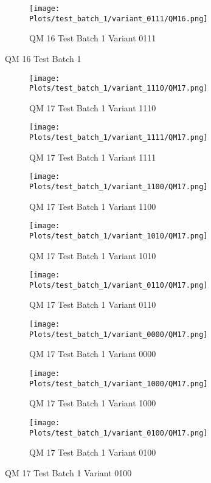 \documentclass{DissertateFigs}
\begin{document}
\begin{figure}[t!]
\medskip

    \begin{subfigure}{0.33\textwidth}
    \texttt{[image: Plots/test\_batch\_1/variant\_0111/QM16.png]}
    \caption{QM 16 Test Batch 1 Variant 0111}
    \end{subfigure}
\caption{QM 16 Test Batch 1}
    \end{figure}
\clearpage
\begin{figure}[t!]
    \begin{subfigure}{0.43\textwidth}
    \texttt{[image: Plots/test\_batch\_1/variant\_1110/QM17.png]}
    \caption{QM 17 Test Batch 1 Variant 1110}
    \end{subfigure}
    \begin{subfigure}{0.43\textwidth}
    \texttt{[image: Plots/test\_batch\_1/variant\_1111/QM17.png]}
    \caption{QM 17 Test Batch 1 Variant 1111}
    \end{subfigure}

\medskip

    \begin{subfigure}{0.43\textwidth}
    \texttt{[image: Plots/test\_batch\_1/variant\_1100/QM17.png]}
    \caption{QM 17 Test Batch 1 Variant 1100}
    \end{subfigure}
    \begin{subfigure}{0.43\textwidth}
    \texttt{[image: Plots/test\_batch\_1/variant\_1010/QM17.png]}
    \caption{QM 17 Test Batch 1 Variant 1010}
    \end{subfigure}

\medskip

    \begin{subfigure}{0.43\textwidth}
    \texttt{[image: Plots/test\_batch\_1/variant\_0110/QM17.png]}
    \caption{QM 17 Test Batch 1 Variant 0110}
    \end{subfigure}
    \begin{subfigure}{0.43\textwidth}
    \texttt{[image: Plots/test\_batch\_1/variant\_0000/QM17.png]}
    \caption{QM 17 Test Batch 1 Variant 0000}
    \end{subfigure}

\medskip

    \begin{subfigure}{0.43\textwidth}
    \texttt{[image: Plots/test\_batch\_1/variant\_1000/QM17.png]}
    \caption{QM 17 Test Batch 1 Variant 1000}
    \end{subfigure}
    \begin{subfigure}{0.43\textwidth}
    \texttt{[image: Plots/test\_batch\_1/variant\_0100/QM17.png]}
    \caption{QM 17 Test Batch 1 Variant 0100}
    \end{subfigure}


\end{figure}
\end{document}
